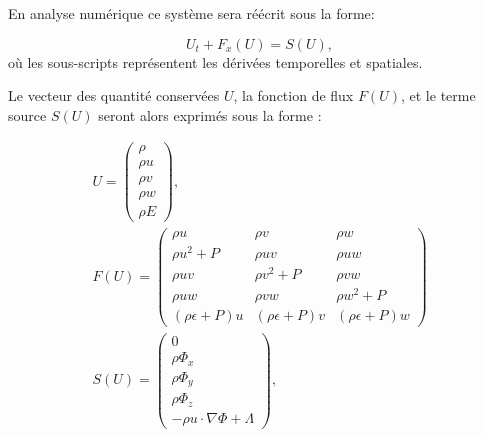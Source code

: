 

%


En analyse numérique ce système sera réécrit sous la forme:

\begin{equation}
U_t+F_x(U) = S(U),
\label{eq:conservation}
\end{equation}
où les sous-scripts représentent les dérivées temporelles et spatiales.

Le vecteur des quantité conservées $U$, la fonction de flux $F(U)$, et le terme source $S(U)$ seront alors exprimés sous la forme :

\begin{equation}
\begin{array}{c}

U=
\left(
\begin{array}{c}
{ \rho}\\
{\rho u}\\
{\rho v}\\
{\rho w}\\
{\rho E}
\end{array}
\right),
\\
F(U)=
\left(
\begin{array}{ccc}
\rho u & \rho v & \rho w \\ 
\rho u^2 +P & \rho uv & \rho uw \\ 
\rho uv & \rho v^2 +P & \rho vw \\ 
\rho uw & \rho vw &\rho w^2 +P \\ 
(\rho \epsilon + P)u & (\rho \epsilon + P)v & (\rho \epsilon + P)w
\end{array} 
\right)
\\
S(U) =
\left(
\begin{array}{c}
{ 0}\\
{\rho \Phi_x}\\
{\rho \Phi_y}\\
{\rho \Phi_z}\\
{- \rho u \cdot \nabla \Phi + \Lambda }
\end{array}
\right),
\end{array} 
\end{equation}


